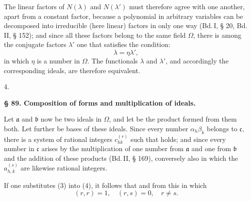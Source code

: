 The linear factors of $N(\lambda)$ and $N(\lambda')$ must therefore agree with one another, apart from a constant factor, because a polynomial in arbitrary variables can be decomposed into irreducible (here linear) factors in only one way (Bd.\,I, § 20, Bd.\,II, § 152); and since all these factors belong to the same field $\Omega$, there is among the conjugate factors $\lambda'$ one that satisfies the condition:
\[
\lambda = \eta\lambda',
\]
in which $\eta$ is a number in $\Omega$. The functionals $\lambda$ and $\lambda'$, and accordingly the corresponding ideals, are therefore equivalent.

4. 

\begin{center}
\textbf{§ 89. Composition of forms and multiplication of ideals.}
\end{center}

Let $\mathfrak{a}$ and $\mathfrak{b}$ now be two ideals in $\Omega$, and let
be the product formed from them both. Let further
be bases of these ideals. Since every number $\alpha_h\beta_k$ belongs to $\mathfrak{c}$, there is a system of rational integers $c^{(r)}_{hk}$ such that
holds; and since every number in $\mathfrak{c}$ arises by the multiplication of one number from $\mathfrak{a}$ and one from $\mathfrak{b}$ and the addition of these products (Bd.\,II, § 169), conversely also
in which the $a^{(s)}_{h,k}$ are likewise rational integers.

If one substitutes (3) into (4), it follows that
and from this
in which
\[
(r,r) = 1, \quad (r,s) = 0, \quad r \neq s.
\]
